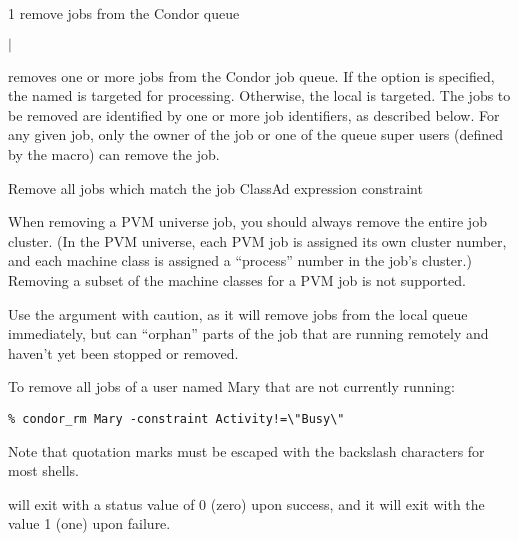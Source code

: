 \begin{ManPage}{\label{man-condor-rm}}{1}
{remove jobs from the Condor queue}
\Synopsis {}
\ToolArgsBase

\ToolLocate
\ToolJobs
$|$  \Dots

\ToolLocate
\ToolAll


\Description

 removes one or more jobs from the Condor job queue.  
If the  option is specified, the named  is targeted
for processing.  
Otherwise, the local  is targeted.
The jobs to be removed are identified by one or more job identifiers, as
described below.
For any given job, only the owner of the job or one of the queue super users
(defined by the  macro) can remove the job.

\begin{Options}
	\ToolArgsBaseDesc
	\ToolLocateDesc
	 {Remove all jobs which match
	                the job ClassAd expression constraint}
\end{Options}

\GenRem

When removing a PVM universe job, you should always remove the entire
job cluster.  (In the PVM universe, each PVM job is assigned its own
cluster number, and each machine class is assigned a ``process''
number in the job's cluster.)  Removing a subset of the machine
classes for a PVM job is not supported.

Use the  argument with caution, as it will remove jobs
from the local queue immediately, but can ``orphan'' parts of the job
that are running remotely and haven't yet been stopped or removed.

\Examples
To remove all jobs of a user named Mary that are not currently running:
\footnotesize
\begin{verbatim}
% condor_rm Mary -constraint Activity!=\"Busy\"
\end{verbatim}
\normalsize
Note that quotation marks must be escaped with the backslash characters
for most shells.

\ExitStatus

 will exit with a status value of 0 (zero) upon success,
and it will exit with the value 1 (one) upon failure.

\end{ManPage}
